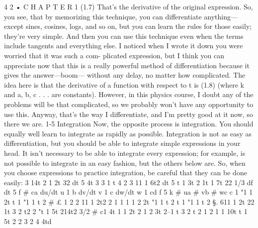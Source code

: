 \documentclass[10pt,oneside]{article}
\begin{document}
4 2 • C H A P T E R  1 (1.7) That’s the derivative of the original expression. So, you see, that by memorizing this technique, you can differentiate anything---except sines, cosines, logs, and so on, but you can learn the rules for those easily; they’re very simple. And then you can use this technique even when the terms include tangents and everything else. I noticed when I wrote it down you were worried that it was such a com- plicated expression, but I think you can appreciate now that this is a really powerful method of differentiation because it gives the answer---boom--- without any delay, no matter how complicated. The idea here is that the derivative of a function with respect to t is (1.8) (where k and a, b, c . . . are constants). However, in this physics course, I doubt any of the problems will be that complicated, so we probably won’t have any opportunity to use this. Anyway, that’s the way I differentiate, and I’m pretty good at it now, so there we are. 1-5 Integration Now, the opposite process is integration. You should equally well learn to integrate as rapidly as possible. Integration is not as easy as differentiation, but you should be able to integrate simple expressions in your head. It isn’t necessary to be able to integrate every expression; for example, is not possible to integrate in an easy fashion, but the others below are. So, when you choose expressions to practice integration, be careful that they can be done easily: 3 14t 2 1 2t 32 dt 5 4t 3 3 1 t 4 2 3 11 1 6t2 dt 5 t 1 3t 2 1t 1 7t 22 1/3 df dt 5 f \# ca du/dt u 1 b dv/dt v 1 c dw/dt w 1 cd f 5 k \# ua \# vb \# wc c 1 "1 1 2t t 1 "1 1 t 2 \# £ 1 2 2 11 1 2t2 2 1 1 1 1 2 2t "1 1 t 2 t 1 "1 1 t 2 §. 611 1 2t 22 1t 3 2 t2 2 "t 1 5t 214t2 3/2 \# c1 4t 1 1 2t 2 1 2 3t 2–1 t 3 2 t 2 1 2 1 1 10t t 1 5t 2 2 3 2 4 4td\par
\end{document}
